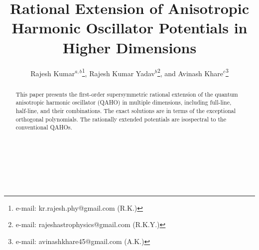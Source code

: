 \documentclass[12pt]{article}
\title{Rational Extension of Anisotropic Harmonic Oscillator Potentials in 
Higher Dimensions}
\author{
Rajesh Kumar$^{a,b}$\thanks{e-mail: kr.rajesh.phy@gmail.com (R.K.)}, 
Rajesh Kumar Yadav$^{b}$\thanks{e-mail: rajeshastrophysics@gmail.com (R.K.Y.)}, and 
Avinash Khare$^{c}$\thanks{e-mail: avinashkhare45@gmail.com (A.K.)}
}
\numberwithin{equation}{section} %
\begin{document}
\maketitle

\begin{center}
 \\
 \\
 \\
\end{center}

\begin{abstract}
This paper presents the first-order supersymmetric rational extension of 
the quantum anisotropic harmonic oscillator (QAHO) in multiple dimensions, 
including full-line, half-line, and their combinations. The exact solutions 
are in terms of the exceptional orthogonal polynomials. The rationally 
extended potentials are isospectral to the conventional QAHOs. 
\end{abstract}

\end{document}
